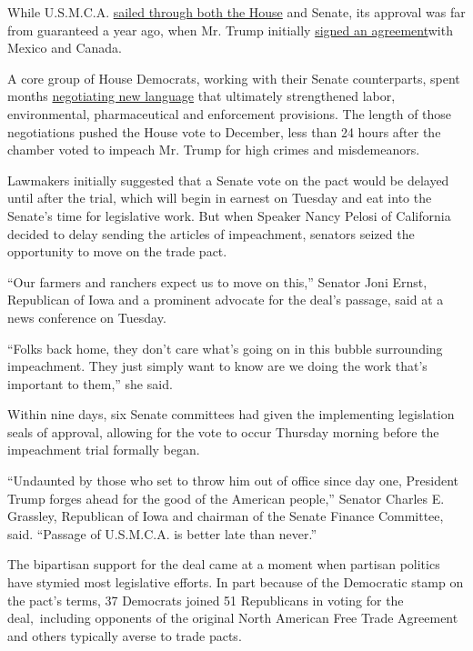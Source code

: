 While U.S.M.C.A.
\href{https://www.nytimes3xbfgragh.onion/2019/12/19/us/politics/usmca-deal.html}{sailed
through both the House} and Senate, its approval was far from guaranteed
a year ago, when Mr. Trump initially
\href{https://www.nytimes3xbfgragh.onion/2018/11/30/world/americas/trump-trudeau-canada-mexico.html}{signed
an agreement}with Mexico and Canada.

A core group of House Democrats, working with their Senate counterparts,
spent months
\href{https://www.nytimes3xbfgragh.onion/2019/12/10/us/politics/usmca-trade-deal.html}{negotiating
new language} that ultimately strengthened labor, environmental,
pharmaceutical and enforcement provisions. The length of those
negotiations pushed the House vote to December, less than 24 hours after
the chamber voted to impeach Mr. Trump for high crimes and misdemeanors.

Lawmakers initially suggested that a Senate vote on the pact would be
delayed until after the trial, which will begin in earnest on Tuesday
and eat into the Senate's time for legislative work. But when Speaker
Nancy Pelosi of California decided to delay sending the articles of
impeachment, senators seized the opportunity to move on the trade pact.

``Our farmers and ranchers expect us to move on this,'' Senator Joni
Ernst, Republican of Iowa and a prominent advocate for the deal's
passage, said at a news conference on Tuesday.

``Folks back home, they don't care what's going on in this bubble
surrounding impeachment. They just simply want to know are we doing the
work that's important to them,'' she said.

Within nine days, six Senate committees had given the implementing
legislation seals of approval, allowing for the vote to occur Thursday
morning before the impeachment trial formally began.

``Undaunted by those who set to throw him out of office since day one,
President Trump forges ahead for the good of the American people,''
Senator Charles E. Grassley, Republican of Iowa and chairman of the
Senate Finance Committee, said. ``Passage of U.S.M.C.A. is better late
than never.''

The bipartisan support for the deal came at a moment when partisan
politics have stymied most legislative efforts. In part because of the
Democratic stamp on the pact's terms, 37 Democrats joined 51 Republicans
in voting for the deal,~including opponents of the original North
American Free Trade Agreement and others typically averse to trade
pacts.


